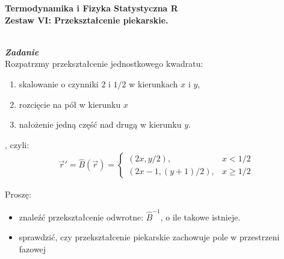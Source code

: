 \documentclass[11pt,a4paper]{article}
\newcounter{zadanie}\newcommand{\zadanie}[1][]{\addtocounter{zadanie}{1} ~\\  {\bf \emph{Zadanie \arabic{zadanie} #1 }} \\}
\begin{document}
   

\begin{centering}
  {\bf {\Large
  Termodynamika i Fizyka Statystyczna R \\
  Zestaw VI: Przekształcenie piekarskie.
  }} \\  
\end{centering}

\vspace{1cm}

\zadanie[]

Rozpatrzmy przekształcenie jednostkowego kwadratu: 
\begin{enumerate}
\item skalowanie o czynniki $2$ i $1/2$ w kierunkach $x$ i $y$, 
\item rozcięcie na pół w kierunku $x$ 
\item nałożenie jedną część nad drugą w kierunku $y$.
\end{enumerate}, czyli:
\begin{align*}
\vec{r}' = \hat{B}(\vec{r}) = \begin{cases} (2x, y/2), & x < 1/2 \\ (2x - 1, (y+1)/2), & x \geq 1/2 \end{cases}
\end{align*}

Proszę:
\begin{itemize}
\item znaleźć przekształcenie odwrotne: $\hat{B}^{-1}$, o ile takowe istnieje.
\item sprawdzić, czy przekształcenie piekarskie zachowuje pole w przestrzeni fazowej
\end{itemize}
\end{document}
